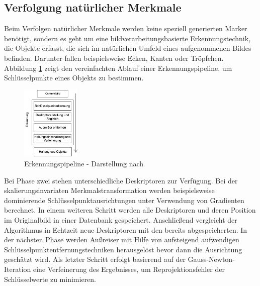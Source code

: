 \documentclass[conference]{IEEEtran}
\begin{document}
\subsection{Verfolgung natürlicher Merkmale}
Beim Verfolgen natürlicher Merkmale werden keine speziell generierten Marker benötigt, sondern es geht um eine bildverarbeitungsbasierte Erkennungstechnik, die Objekte erfasst, die sich im natürlichen Umfeld eines aufgenommenen Bildes befinden. Darunter fallen beispielsweise Ecken, Kanten oder Tröpfchen. Abbildung \ref{fig:1} zeigt den vereinfachten Ablauf einer Erkennungspipeline, um Schlüsselpunkte eines Objekts zu bestimmen.
\begin{figure}[htbp]
	\centering
	\includegraphics[width=0.25\textwidth]{images/natural_feature_tracking.png}
	\caption{Erkennungspipeline - Darstellung nach \autocite[S. 28]{cukovic2015marker}}
	\label{fig:1}
\end{figure}
Bei Phase zwei stehen unterschiedliche Deskriptoren zur Verfügung. Bei der skalierungsinvariaten Merkmalstransformation werden beispielsweise dominierende Schlüsselpunktausrichtungen unter Verwendung von Gradienten berechnet. In einem weiteren Schritt werden alle Deskriptoren und deren Position im Originalbild in einer Datenbank gespeichert. Anschließend vergleicht der Algorithmus in Echtzeit neue Deskriptoren mit den bereits abgespeicherten. In der nächsten Phase werden Außreiser mit Hilfe von aufsteigend aufwendigen Schlüsselpunktentfernungstechniken herausgelöst bevor dann die Ausrichtung geschätzt wird. Als letzter Schritt erfolgt basierend auf der Gauss-Newton-Iteration eine Verfeinerung des Ergebnisses, um Reprojektionsfehler der Schlüsselwerte zu minimieren.\autocite[S. 28 f.]{cukovic2015marker}





\renewcommand*{\bibfont}{\small}
\printbibliography
\end{document}
